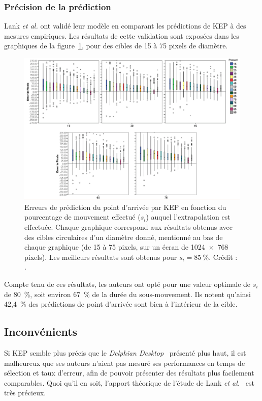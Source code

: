 	\subsubsection{Précision de la prédiction}
	Lank \emph{et al.} ont validé leur modèle en comparant les prédictions de KEP à des mesures empiriques. Les résultats de cette validation sont exposées dans les graphiques de la figure~\ref{fig:kepErrors}, pour des cibles de 15 à 75 pixels de diamètre.
	
	\begin{figure}[H]
		\centering
		\includegraphics[width=\textwidth]{figures/ch2/kepErrors}
		\caption[KEP --- erreurs de prédiction]{Erreurs de prédiction du point d'arrivée par KEP en fonction du pourcentage de mouvement effectué ($s_{i}$) auquel l'extrapolation est effectuée. Chaque graphique correspond aux résultats obtenus avec des cibles circulaires d'un diamètre donné, mentionné au bas de chaque graphique (de 15 à 75 pixels, sur un écran de 1024~$\times$~768 pixels). Les meilleurs résultats sont obtenus pour $s_{i} = 85~\%{}$. Crédit : \cite{lank2007endpoint}.}
		\label{fig:kepErrors}
	\end{figure}
	
	Compte tenu de ces résultats, les auteurs ont opté pour une valeur optimale de $s_{i}$ de 80~\%{}, soit environ 67~\%{} de la durée du sous-mouvement. Ils notent qu'ainsi 42,4~\%{} des prédictions de point d'arrivée sont bien à l'intérieur de la cible.	
	
	\subsection{Inconvénients}
	Si KEP semble plus précis que le \emph{Delphian Desktop}~\cite{asano2005predictive} présenté plus haut, il est malheureux que ses auteurs n'aient pas mesuré ses performances en temps de sélection et taux d'erreur, afin de pouvoir présenter des résultats plus facilement comparables. Quoi qu'il en soit, l'apport théorique de l'étude de Lank \emph{et al.}~\cite{lank2007endpoint} est très précieux.
	
